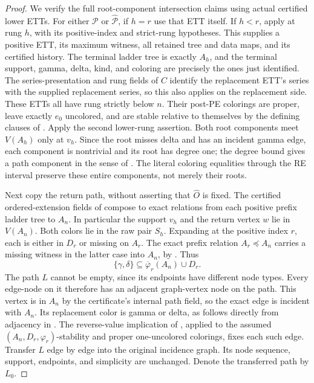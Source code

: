 \begin{proof}
We verify the full root-component intersection claims using actual
certified lower ETTs.  For either $\mathcal P$ or
$\widehat{\mathcal P}$, if $h=r$ use that ETT itself.  If $h<r$, apply
 at rung $h$, with its positive-index
and strict-rung hypotheses.  This supplies a positive ETT, its maximum
witness, all retained tree and data maps, and its certified history.
The terminal ladder tree is exactly $A_h$, and the terminal support,
gamma, delta, kind, and coloring are precisely the ones just identified.
The series-presentation and rung fields of $C$ identify the replacement
ETT's series with the supplied replacement series, so this also applies
on the replacement side.  These ETTs all have rung strictly below $n$.
Their post-PE colorings are proper, leave exactly $e_0$ uncolored, and
are stable relative to themselves by the defining clauses of
.  Apply the second lower-rung assertion.
Both root components meet $V(A_h)$ only at $v_h$.  Since the root misses
delta and has an incident gamma edge, each component is nontrivial and
its root has degree one; the degree bound
 gives a path component in the
sense of .  The literal coloring
equalities through the RE interval preserve these entire components,
not merely their roots.

Next copy the return path, without asserting that $\widehat O$ is fixed.
The certified ordered-extension fields of
 compose to exact
 relations from each positive
prefix ladder tree to $A_n$.  In particular the support $v_h$ and the
return vertex $w$ lie in $V(A_n)$.  Both colors lie in the raw pair
$S_h$.  Expanding  at the positive index
$r$, each is either in $D_r$ or missing on $A_r$.  The exact prefix
relation $A_r\preccurlyeq A_n$ carries a missing witness in the latter
case into $A_n$, by .
Thus
\[
 \{\gamma,\delta\}\subseteq\overline\varphi_r(A_n)\cup D_r.
\]
The path $L$ cannot be empty, since its endpoints have different node
types.  Every edge-node on it therefore has an adjacent graph-vertex
node on the path.  This vertex is in $A_n$ by the certificate's internal
path field, so the exact edge is incident with $A_n$.  Its replacement
color is gamma or delta, as follows directly from adjacency in
.  The reverse-value implication of
, applied to the assumed
$(A_n,D_r,\varphi_r)$-stability and proper one-uncolored colorings,
fixes each such edge.  Transfer $L$ edge by edge into the original
incidence graph.  Its node sequence, support, endpoints, and simplicity
are unchanged.  Denote the transferred path by $L_0$.


\end{proof}
